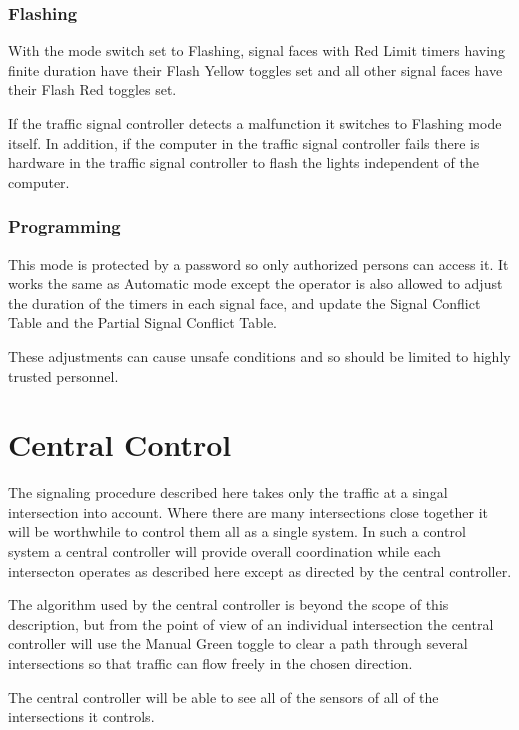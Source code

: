 \documentclass[letterpaper,twoside]{article}
\begin{document}
\subsubsection{Flashing}

With the mode switch set to Flashing, signal faces with Red Limit
timers having finite duration have their Flash Yellow toggles set
and all other signal faces have their Flash Red toggles set.

If the traffic signal controller detects a malfunction it switches
to Flashing mode itself.  In addition, if the computer in the traffic
signal controller fails there is hardware in the traffic signal
controller to flash the lights independent of the computer.

\subsubsection{Programming}

This mode is protected by a password so only authorized persons can access it.
It works the same as Automatic mode except the operator is also allowed to
adjust the duration of the timers in each signal face, and update the
Signal Conflict Table and the Partial Signal Conflict Table.

These adjustments can cause unsafe conditions and so should be limited
to highly trusted personnel.

\section{Central Control}

The signaling procedure described here takes only the traffic at a singal
intersection into account.  Where there are many intersections close
together it will be worthwhile to control them all as a single system.
In such a control system a central controller will provide overall
coordination while each intersecton operates as described here except as
directed by the central controller.

The algorithm used by the central controller is beyond the scope of this
description, but from the point of view of an individual intersection
the central controller will use the Manual Green toggle to clear a path
through several intersections so that traffic can flow freely in the
chosen direction.

The central controller will be able to see all of the sensors of all
of the intersections it controls.
\end{document}
